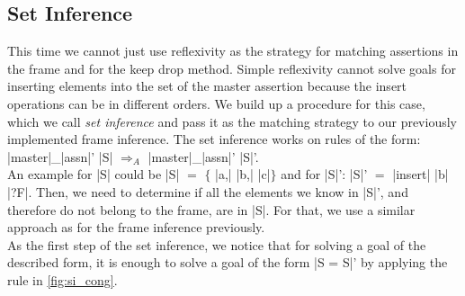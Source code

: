 \subsection{Set Inference}\label{section:si}

This time we cannot just use reflexivity as the strategy for matching assertions in the frame and for the keep drop method. Simple reflexivity cannot solve goals for inserting elements into the set of the master assertion because the insert operations can be in different orders. We build up a procedure for this case, which we call \textit{set inference} and pass it as the matching strategy to our previously implemented frame inference. The set inference works on rules of the form: |master|\_|assn|' |S| $\Longrightarrow_A$ |master|\_|assn|' |S|'.\\
An example for |S| could be |S| $=$ $\{$ |a,| |b,| |c|$\}$ and for |S|': |S|' $=$ |insert| |b| |?F|. Then, we need to determine if all the elements we know in |S|', and therefore do not belong to the frame, are in |S|. For that, we use a similar approach as for the frame inference previously. \\
As the first step of the set inference, we notice that for solving a goal of the described form, it is enough to solve a goal of the form |S = S|' by applying the rule in \autoref{fig:si_cong}.

